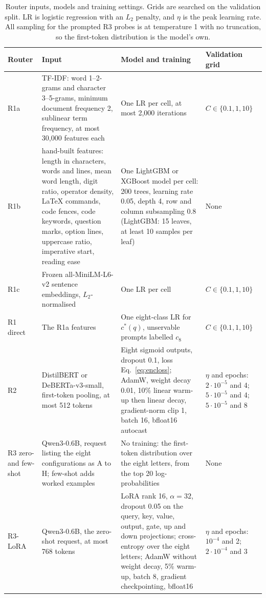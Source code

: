 \documentclass[final,5p,times,twocolumn]{elsarticle}
\theoremstyle{plain}
\newcommand{\cstar}{c^{*}}
\begin{document}
\begin{table}[ht]
\centering
\footnotesize
\caption{Router inputs, models and training settings. Grids are searched on
the validation split. LR is logistic regression with an $L_2$ penalty, and
$\eta$ is the peak learning rate. All sampling for the prompted R3 probes is
at temperature 1 with no truncation, so the first-token distribution is the
model's own.}
\label{tab:hyper}
\renewcommand{\arraystretch}{1.15}
\setlength{\tabcolsep}{4pt}
\begin{tabularx}{\textwidth}{@{}l >{\raggedright\arraybackslash}p{3.7cm} >{\raggedright\arraybackslash}X >{\raggedright\arraybackslash}p{3.5cm}@{}}
\toprule
Router & Input & Model and training & Validation grid \\
\midrule
R1a & TF-IDF: word 1--2-grams and character 3--5-grams, minimum document frequency 2, sublinear term frequency, at most 30{,}000 features each & One LR per cell, at most 2{,}000 iterations & $C \in \{0.1, 1, 10\}$ \\
R1b & 14 hand-built features: length in characters, words and lines, mean word length, digit ratio, operator density, LaTeX commands, code fences, code keywords, question marks, option lines, uppercase ratio, imperative start, reading ease & One LightGBM or XGBoost model per cell: 200 trees, learning rate 0.05, depth 4, row and column subsampling 0.8 (LightGBM: 15 leaves, at least 10 samples per leaf) & None \\
R1c & Frozen all-MiniLM-L6-v2 sentence embeddings, $L_2$-normalised & One LR per cell & $C \in \{0.1, 1, 10\}$ \\
R1 direct & The R1a features & One eight-class LR for $\cstar(q)$, unservable prompts labelled $c_8$ & $C \in \{0.1, 1, 10\}$ \\
R2 & DistilBERT or DeBERTa-v3-small, first-token pooling, at most 512 tokens & Eight sigmoid outputs, dropout 0.1, loss Eq.~\eqref{eq:encloss}; AdamW, weight decay 0.01, 10\% linear warm-up then linear decay, gradient-norm clip 1, batch 16, bfloat16 autocast & $\eta$ and epochs: $2{\cdot}10^{-5}$ and 4; $5{\cdot}10^{-5}$ and 4; $5{\cdot}10^{-5}$ and 8 \\
R3 zero- and few-shot & Qwen3-0.6B, request listing the eight configurations as A to H; few-shot adds worked examples & No training: the first-token distribution over the eight letters, from the top 20 log-probabilities & None \\
R3-LoRA & Qwen3-0.6B, the zero-shot request, at most 768 tokens & LoRA rank 16, $\alpha = 32$, dropout 0.05 on the query, key, value, output, gate, up and down projections; cross-entropy over the eight letters; AdamW without weight decay, 5\% warm-up, batch 8, gradient checkpointing, bfloat16 & $\eta$ and epochs: $10^{-4}$ and 2; $2{\cdot}10^{-4}$ and 3 \\
\bottomrule
\end{tabularx}
\end{table}
\end{document}

